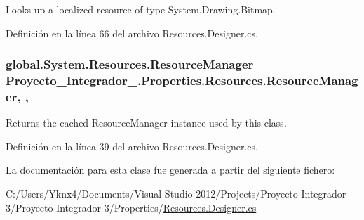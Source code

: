Looks up a localized resource of type System.\-Drawing.\-Bitmap. 



Definición en la línea 66 del archivo Resources.\-Designer.\-cs.

\hypertarget{class_proyecto___integrador__3_1_1_properties_1_1_resources_a1b372445ca4c7c8e887fec68ab63ac40}{
\subsubsection[{Resource\-Manager}]{\setlength{\rightskip}{0pt plus 5cm}global.\-System.\-Resources.\-Resource\-Manager Proyecto\-\_\-\-Integrador\-\_.\-Properties.\-Resources.\-Resource\-Manager\hspace{0.3cm}{\ttfamily [static]}, {\ttfamily [get]}, {\ttfamily [package]}}}\label{class_proyecto___integrador__3_1_1_properties_1_1_resources_a1b372445ca4c7c8e887fec68ab63ac40}


Returns the cached Resource\-Manager instance used by this class. 



Definición en la línea 39 del archivo Resources.\-Designer.\-cs.



La documentación para esta clase fue generada a partir del siguiente fichero\-:\begin{DoxyCompactItemize}
\item 
C\-:/\-Users/\-Yknx4/\-Documents/\-Visual Studio 2012/\-Projects/\-Proyecto Integrador 3/\-Proyecto Integrador 3/\-Properties/\hyperlink{_resources_8_designer_8cs}{Resources.\-Designer.\-cs}\end{DoxyCompactItemize}
